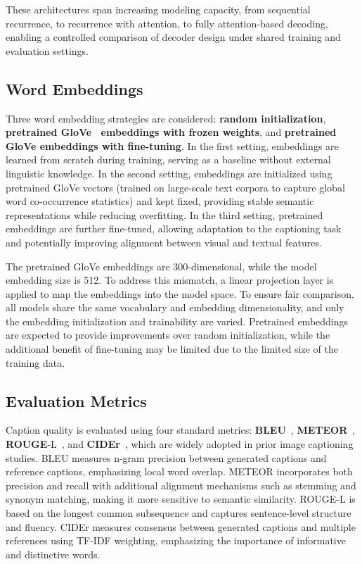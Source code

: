 \documentclass[10pt,twocolumn,letterpaper]{article}
\begin{document}
These architectures span increasing modeling capacity, from sequential
recurrence, to recurrence with attention, to fully attention-based
decoding, enabling a controlled comparison of decoder design under
shared training and evaluation settings.

\subsection{Word Embeddings}
Three word embedding strategies are considered: \textbf{random
initialization}, \textbf{pretrained GloVe~\cite{pennington2014glove}
embeddings with frozen weights}, and \textbf{pretrained GloVe
embeddings with fine-tuning}. In the first setting, embeddings are
learned from scratch during training, serving as a baseline without
external linguistic knowledge. In the second setting, embeddings are
initialized using pretrained GloVe vectors (trained on large-scale
text corpora to capture global word co-occurrence statistics) and
kept fixed, providing stable semantic representations while reducing
overfitting. In the third setting, pretrained embeddings are further
fine-tuned, allowing adaptation to the captioning task and
potentially improving alignment between visual and textual features.

The pretrained GloVe embeddings are 300-dimensional, while the model
embedding size is 512. To address this mismatch, a linear projection
layer is applied to map the embeddings into the model space. To
ensure fair comparison, all models share the same vocabulary and
embedding dimensionality, and only the embedding initialization and
trainability are varied. Pretrained embeddings are expected to
provide improvements over random initialization, while the additional
benefit of fine-tuning may be limited due to the limited size of the
training data.

\subsection{Evaluation Metrics}
Caption quality is evaluated using four standard metrics:
\textbf{BLEU}~\cite{papineni2002bleu},
\textbf{METEOR}~\cite{banerjee2005meteor},
\textbf{ROUGE}-L~\cite{lin2004rouge}, and
\textbf{CIDEr}~\cite{vedantam2015cider}, which are widely adopted in
prior image captioning studies. BLEU measures n-gram precision
between generated captions and reference captions, emphasizing local
word overlap. METEOR incorporates both precision and recall with
additional alignment mechanisms such as stemming and synonym
matching, making it more sensitive to semantic similarity. ROUGE-L is
based on the longest common subsequence and captures sentence-level
structure and fluency. CIDEr measures consensus between generated
captions and multiple references using TF-IDF weighting, emphasizing
the importance of informative and distinctive words.
\end{document}
